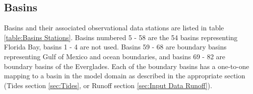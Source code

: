 \subsection{Basins}
\label{sec:Input Basins}

Basins and their associated observational data stations are listed in table \ref{table:Basins Stations}.  Basins numbered 5 - 58 are the 54 basins representing Florida Bay, basins 1 - 4 are not used. Basins 59 - 68 are boundary basins representing Gulf of Mexico and ocean boundaries, and basins 69 - 82 are boundary basins of the Everglades. Each of the boundary basins has a one-to-one mapping to a basin in the model domain as described in the appropriate section (Tides section \ref{sec:Tides}, or Runoff section \ref{sec:Input Data Runoff}). 

